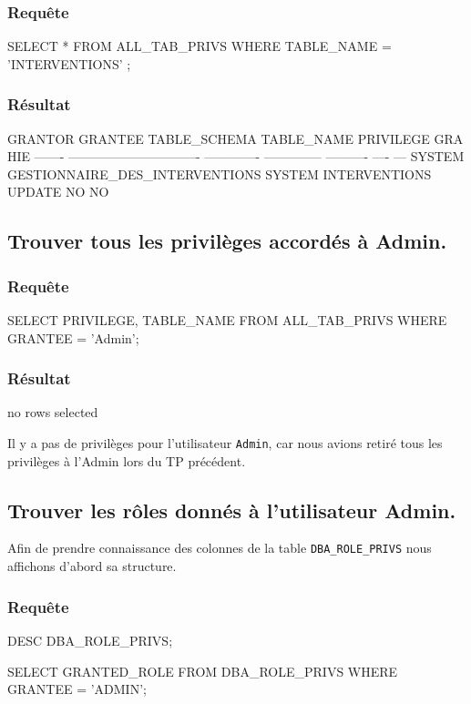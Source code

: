 \documentclass[•]{article}
\begin{document}
\subsubsection{Requête}
\begin{sql}
 SELECT * 
 FROM ALL_TAB_PRIVS 
 WHERE TABLE_NAME = 'INTERVENTIONS' ;
\end{sql}

\subsubsection{Résultat}
\begin{sql}
GRANTOR GRANTEE					        TABLE_SCHEMA  TABLE_NAME	 PRIVILEGE  GRA  HIE
------- ------------------------------- ------------- -------------- ---------- ---- ---
SYSTEM  GESTIONNAIRE_DES_INTERVENTIONS	 SYSTEM        INTERVENTIONS  UPDATE     NO   NO
\end{sql}


\subsection{Trouver tous les privilèges accordés à Admin.}
\subsubsection{Requête}
\begin{sql}
SELECT PRIVILEGE, TABLE_NAME 
FROM ALL_TAB_PRIVS 
WHERE GRANTEE = 'Admin';
\end{sql}

\subsubsection{Résultat}
\begin{sql}
no rows selected
\end{sql}

Il y a pas de privilèges pour l'utilisateur \texttt{Admin}, car nous avions retiré tous les privilèges à l'Admin lors du TP précédent.

\subsection{Trouver les rôles donnés à l'utilisateur Admin.}
Afin de prendre connaissance des colonnes de la table \texttt{DBA\_ROLE\_PRIVS} nous affichons d'abord sa structure.

\subsubsection{Requête}
\begin{sql}
DESC DBA_ROLE_PRIVS;

SELECT GRANTED_ROLE 
FROM DBA_ROLE_PRIVS 
WHERE GRANTEE = 'ADMIN';
\end{sql}
\end{document}
